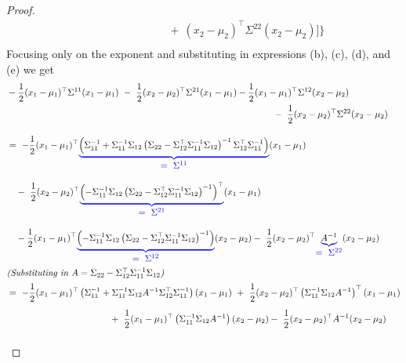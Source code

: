 \documentclass[twoside,11pt]{homework}
\DeclarePairedDelimiter{\2norm}{\lVert}{\rVert^2_2}
\newcommand{\1}[1]{\mathds{1}\left[#1\right]}
\begin{document}
\begin{proof}
\begin{align*}
&\quad  \ \ \ \ \ \ \ \ \ \ \ \ \ \ \ \ \ \ \ \ \ \ \ \ \ \ \ + \ (x_2 - \mu_2)^{\top}\Sigma^{22}(x_2-\mu_2)\Big] \Bigg\}  \\[1em]
\end{align*}
Focusing only on the exponent and substituting in expressions (b), (c), (d), and (e) we get
\begin{align*}
& -\frac{1}{2}(x_1 - \mu_1)^{\top}\Sigma^{11}(x_1-\mu_1) \ - \ \frac{1}{2}(x_2 - \mu_2)^{\top}\Sigma^{21}(x_1-\mu_1)  - \frac{1}{2}(x_1 - \mu_1)^{\top}\Sigma^{12}(x_2-\mu_2) \\
&\quad \ \ \ \ \ \ \ \ \ \ \ \ \ \ \ \ \ \ \ \ \ \ \ \ \ \ \ \ \ \ \ \ \ \ \ \ \ \ \ \ \ \ \ \ \ \ \ \ \ \ \ \ \ \ \ \ \ \ \ \ \ \ \ \ \ \ \ \ \ \ \ \ \ \ \ \ \ \ \ \ \ \ \ \ \ - \ \frac{1}{2}(x_2 - \mu_2)^{\top}\Sigma^{22}(x_2-\mu_2) \\[1em]
& = \ -\frac{1}{2}(x_1 - \mu_1)^{\top}{\color{blue} \underbrace{\color{black} \left(\Sigma_{11}^{-1} + \Sigma_{11}^{-1}\Sigma_{12}\left(\Sigma_{22} - \Sigma_{12}^{\top}\Sigma_{11}^{-1}\Sigma_{12}\right)^{-1}\Sigma_{12}^{\top}\Sigma_{11}^{-1}\right)}_{\mathlarger{= \ \Sigma^{11}}}}(x_1-\mu_1)  \\[1em]
 &\quad - \ \frac{1}{2}(x_2 - \mu_2)^{\top}{\color{blue} \underbrace{\color{black} \left(- \Sigma_{11}^{-1}\Sigma_{12}\left(\Sigma_{22} - \Sigma_{12}^{\top}\Sigma_{11}^{-1}\Sigma_{12}\right)^{-1}\right)^{\top}}_{\mathlarger{= \ \Sigma^{21}}}}(x_1-\mu_1) \\[1em]
 &\quad - \frac{1}{2}(x_1 - \mu_1)^{\top}{\color{blue} \underbrace{\color{black} \left(-\Sigma_{11}^{-1}\Sigma_{12}\left(\Sigma_{22} - \Sigma_{12}^{\top}\Sigma_{11}^{-1}\Sigma_{12}\right)^{-1}\right)}_{\mathlarger{= \ \Sigma^{12}}}}(x_2-\mu_2) - \ \frac{1}{2}(x_2 - \mu_2)^{\top}{\color{blue} \underbrace{\color{black} A^{-1}}_{\mathlarger{= \ \Sigma^{22}}}}(x_2-\mu_2) \\
 \intertext{\emph{(Substituting in $A = \Sigma_{22} - \Sigma_{12}^{\top}\Sigma_{11}^{-1}\Sigma_{12} $)}}
 & = \ -\frac{1}{2}(x_1 - \mu_1)^{\top} \left(\Sigma_{11}^{-1} + \Sigma_{11}^{-1}\Sigma_{12}A^{-1}\Sigma_{12}^{\top}\Sigma_{11}^{-1}\right)(x_1-\mu_1) \ + \ \frac{1}{2}(x_2 - \mu_2)^{\top} \left(\Sigma_{11}^{-1}\Sigma_{12}A^{-1}\right)^{\top}(x_1-\mu_1) \\[0.5em]
&\quad \ \ \ \ \ \ \ \ \ \ \ \ \ \ \ \ \ \ \ \ \ \ \ \ \ \ \ \ \ \ \ + \ \frac{1}{2}(x_1 - \mu_1)^{\top} \left(\Sigma_{11}^{-1}\Sigma_{12}A^{-1}\right)(x_2-\mu_2) - \ \frac{1}{2}(x_2 - \mu_2)^{\top}A^{-1}(x_2-\mu_2) \\[1em]

\end{align*}
\end{proof}
\end{document}
